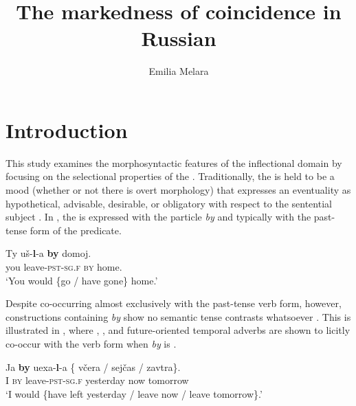 \documentclass[output=paper,modfonts,newtxmath,hidelinks,]{langscibook}
\title{The markedness of coincidence in Russian}
\author{Emilia Melara\affiliation{University of Toronto}}
\begin{document}
\maketitle
{}



\section{Introduction}\label{10:s1}


This study examines the morphosyntactic features of the  inflectional domain by focusing on the selectional properties of the  . Traditionally, the  is held to be a mood (whether or not there is overt morphology) that expresses an eventuality as hypothetical, advisable, desirable, or obligatory with respect to the sentential subject  \citep[142]{HarrisonLeFleming2000}. In , the  is expressed with the particle \textit{by} and typically with the past-tense form of the predicate.

\ea \label{10:ex1}
\gll Ty uš-\textbf{l}{}-a \textbf{by} domoj.\\
     you leave\textsc{-pst-sg.f} \textsc{by} home.\\
\glt `You would \{go / have gone\} home.' \hfill \citep[152]{Mezhevich2006}
\z

\noindent Despite co-occurring almost exclusively with the past-tense verb form, however, constructions containing \textit{by} show no semantic tense contrasts whatsoever \citep[298]{Spencer2001}. This is illustrated in , where , , and future-oriented temporal adverbs are shown to licitly co-occur with the  verb form when \textit{by} is . 

\ea \label{10:ex2}
\gll Ja \textbf{by} uexa-\textbf{l}{}-a \{\hspace{-2pt} včera / sejčas / zavtra\}.\\
     I \textsc{by} leave\textsc{-pst-sg.f} {} yesterday {} now {} tomorrow\\
\glt `I would \{have left yesterday / leave now / leave tomorrow\}.'\\
\hfill \citep[136]{Mezhevich2006}
\z
\end{document}
